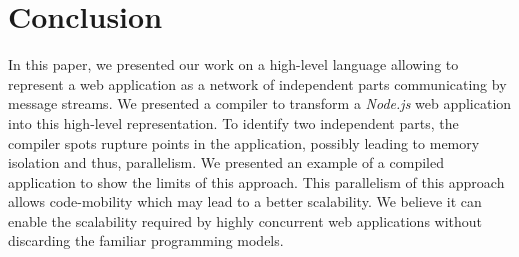 \section{Conclusion} \label{section:conclusion}


In this paper, we presented our work on a high-level language allowing to represent a web application as a network of independent parts communicating by message streams.
We presented a compiler to transform a \textit{Node.js} web application into this high-level representation.
To identify two independent parts, the compiler spots rupture points in the application, possibly leading to memory isolation and thus, parallelism.
We presented an example of a compiled application to show the limits of this approach.
This parallelism of this approach allows code-mobility which may lead to a better scalability.
We believe it can enable the scalability required by highly concurrent web applications without discarding the familiar programming models.

\endinput

Many frameworks for distributed systems focus mainly on the performances\cite{Akidau2013, Jain2006, Marz2011, Welsh2000, Wu2007, Zaharia2010}.
However, we focus on a compilation approach to replace the shift in programming model rather than the performance of the runtime.
We present in this section an extremely simplified but generic execution model inspired by the literature, only to support the confirmation of feasibility for the compilation process detailed in section \ref{section:compiler}.
The execution model is not distributed on remote machines, however it can isolate the execution of fluxions in different processes to reproduce the conditions of a distributed execution model.
We are interested in the problems arising from this isolation.

